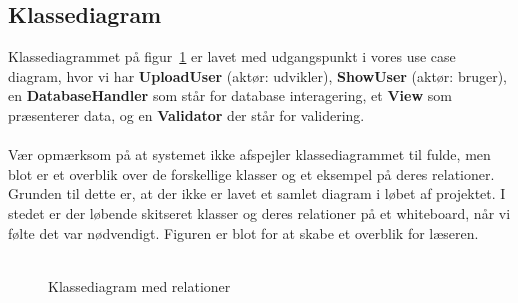 \subsection{Klassediagram}
Klassediagrammet på figur~\ref{fig:klassediagram} er lavet med udgangspunkt i vores use case diagram, hvor vi har \textbf{UploadUser} (aktør: udvikler), \textbf{ShowUser} (aktør: bruger), en \textbf{DatabaseHandler} som står for database interagering, et \textbf{View} som præsenterer data, og en \textbf{Validator} der står for validering.
\\\\
Vær opmærksom på at systemet ikke afspejler klassediagrammet til fulde, men blot er et overblik over de forskellige klasser og et eksempel på deres relationer.
Grunden til dette er, at der ikke er lavet et samlet diagram i løbet af projektet.
I stedet er der løbende skitseret klasser og deres relationer på et whiteboard, når vi følte det var nødvendigt.
Figuren er blot for at skabe et overblik for læseren.
\\\\
\begin{figure}[H]
\caption{Klassediagram med relationer}
\label{fig:klassediagram}
\end{figure}
